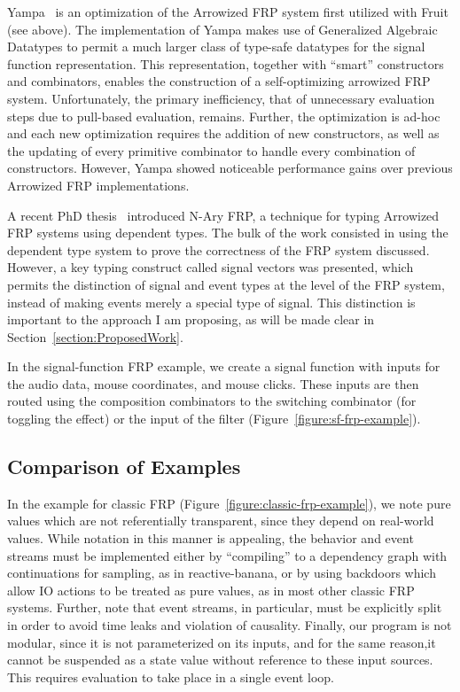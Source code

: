 Yampa~\cite{Nilsson2005} is an optimization of the Arrowized FRP system first utilized with Fruit (see above). The implementation of Yampa makes use of Generalized Algebraic Datatypes to permit a much larger class of type-safe datatypes for the signal function representation. This representation, together with ``smart''
constructors and combinators, enables the construction of a self-optimizing arrowized FRP system. Unfortunately, the primary inefficiency, that of unnecessary evaluation
steps due to pull-based evaluation, remains. Further, the optimization is ad-hoc and each new optimization requires the addition of new constructors, as well
as the updating of every primitive combinator to handle every combination of constructors. However, Yampa showed noticeable performance gains over previous Arrowized FRP implementations.

A recent PhD thesis~\cite{Sculthorpe2011} introduced N-Ary FRP, a technique for typing Arrowized FRP systems using dependent types. The bulk of the work consisted
in using the dependent type system to prove the correctness of the FRP system discussed. However, a key typing construct called signal vectors was presented,
which permits the distinction of signal and event types at the level of the FRP system, instead of making events merely a special type of signal. This distinction
is important to the approach I am proposing, as will be made clear in Section~\ref{section:ProposedWork}.

In the signal-function FRP example, we create a signal function with inputs for the audio data, mouse coordinates, and mouse clicks. These inputs are then routed
using the composition combinators to the switching combinator (for toggling the effect) or the input of the filter (Figure~\ref{figure:sf-frp-example}).

\subsection{Comparison of Examples}
\label{subsection:comparison_of_examples}

In the example for classic FRP (Figure~\ref{figure:classic-frp-example}), we note pure values which are not referentially transparent,
since they depend on real-world values. While notation in this manner is appealing, the behavior and event streams must be implemented either
by ``compiling'' to a dependency graph with continuations for sampling, as in reactive-banana, or by using backdoors which allow
IO actions to be treated as pure values, as in most other classic FRP systems.
Further, note that event streams, in particular, must be explicitly split in order to avoid time leaks and violation of causality.
Finally, our program is not modular, since it is not parameterized on its inputs, and for the same reason,it cannot be suspended as a state value without reference
to these input sources. This requires evaluation to take place in a single event loop.

